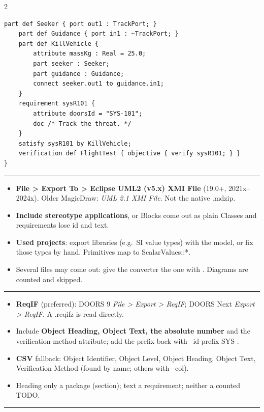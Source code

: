 \documentclass[letterpaper]{article}
\newcommand{\head}[1]{\par\vspace{7pt}{\sffamily\bfseries\large #1}\par\vspace{1pt}\hrule\vspace{4pt}}
\newcommand{\cmd}[1]{{\footnotesize\ttfamily #1}}
\begin{document}
\begin{multicols}{2}
\begin{Verbatim}[fontsize=\scriptsize,frame=single,framesep=3pt]
    part def Seeker { port out1 : TrackPort; }
    part def Guidance { port in1 : ~TrackPort; }
    part def KillVehicle {
        attribute massKg : Real = 25.0;
        part seeker : Seeker;
        part guidance : Guidance;
        connect seeker.out1 to guidance.in1;
    }
    requirement sysR101 {
        attribute doorsId = "SYS-101";
        doc /* Track the threat. */
    }
    satisfy sysR101 by KillVehicle;
    verification def FlightTest { objective { verify sysR101; } }
}
\end{Verbatim}
\begin{minipage}{\linewidth}\head{Exporting from Cameo / MagicDraw}
\begin{itemize}
\item \textbf{File > Export To > Eclipse UML2 (v5.x) XMI File} (19.0+, 2021x--2024x). Older MagicDraw: \emph{UML 2.1 XMI File}. Not the native \cmd{.mdzip}.
\item \textbf{Include stereotype applications}, or Blocks come out as plain Classes and requirements lose id and text.
\item \textbf{Used projects}: export libraries (e.g.\ SI value types) with the model, or fix those types by hand. Primitives map to \cmd{ScalarValues::*}.
\item Several files may come out: give the converter the one with \cmd{<uml:Model>}. Diagrams are counted and skipped.
\end{itemize}
\end{minipage}
\begin{minipage}{\linewidth}\head{Exporting from DOORS}
\begin{itemize}
\item \textbf{ReqIF} (preferred): DOORS 9 \emph{File > Export > ReqIF}; DOORS Next \emph{Export > ReqIF}. A \cmd{.reqifz} is read directly.
\item Include \textbf{Object Heading, Object Text, the absolute number} and the verification-method attribute; add the prefix back with \cmd{--id-prefix SYS-}.
\item \textbf{CSV} fallback: Object Identifier, Object Level, Object Heading, Object Text, Verification Method (found by name; others with \cmd{--col}).
\item Heading only \textrightarrow{} a package (section); text \textrightarrow{} a requirement; neither \textrightarrow{} a counted TODO.
\end{itemize}
\end{minipage}
\head{Checking the output}
\begin{itemize}

\end{itemize}
\end{multicols}
\end{document}
